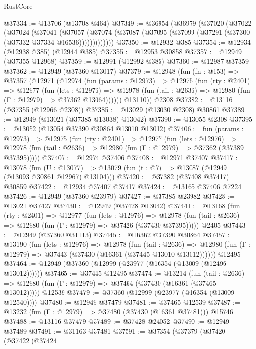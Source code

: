 \begin{lexlean}{RustCore}
\begin{coremodule}
@37334 := @13706 (@13708 @464)
@37349 := @36954
    (@36979
      (@37020
        (@37022
          (@37024
            (@37041
              (@37057
                (@37074 (@37087 (@37095 (@37099 (@37291 (@37300 (@37332 @37334 @16536)))))))))))))
@37350 := @12932 @385
@37354 := @12934 (@12938 @385) (@12944 @385)
@37355 := @12953 @30858
@37357 := @12949 (@37355 @12968)
@37359 := @12991 (@12992 @385)
@37360 := @12987 @37359
@37362 := @12949 (@37360 @13017)
@37379 := @12948
    (fun (fn : @153) =>
    @37357
      (@12971
        (@12974
          (fun (params : @12973) =>
          @12975
            (fun (rty : @2401) =>
            @12977
              (fun (lets : @12976) =>
              @12978 (fun (tail : @2636) => @12980 (fun (Γ : @12979) => @37362 @13064))))))
        @13110))
    @2308
@37382 := @13116 (@37355 (@12966 @2308))
@37385 := @13029 (@13030 @2308) @30861
@37389 := @12949 (@13021 (@37385 @13038) @13042)
@37390 := @13055 @2308
@37395 := @13052 (@13054 @37390 @30864 @13010 @13012)
@37406 := fun (params : @12973) =>
  @12975
    (fun (rty : @2401) =>
    @12977
      (fun (lets : @12976) =>
      @12978 (fun (tail : @2636) => @12980 (fun (Γ : @12979) => @37362 (@37389 @37395)))))
@37407 := @12974 @37406
@37408 := @12971 @37407
@37417 := @13078
    (fun (U : @13077) => @13079 (fun (t : @7) => @13087 (@12949 (@13093 @30861 @12967) @13104)))
@37420 := @37382 (@37408 @37417) @30859
@37422 := @12934 @37407 @37417
@37424 := @13165 @37406 @7224
@37426 := @12949 (@37360 @23979)
@37427 := @37385 @23982
@37428 := @13021 @37427
@37430 := @12949 (@37428 @13042)
@37441 := @13168
    (fun (rty : @2401) =>
    @12977
      (fun (lets : @12976) =>
      @12978 (fun (tail : @2636) => @12980 (fun (Γ : @12979) => @37426 (@37430 @37395)))))
    @2405
@37443 := @12949 (@37360 @31113)
@37445 := @16362 @37390 @30864
@37457 := @13190
    (fun (lets : @12976) =>
    @12978
      (fun (tail : @2636) =>
      @12980 (fun (Γ : @12979) => @37443 (@37430 (@16361 (@37445 @13010 @13012))))))
    @12495
@37464 := @12949 (@37360 (@12999 (@23977 (@16354 (@13009 (@12496 @13012))))))
@37465 := @37445 @12495
@37474 := @13214
    (fun (tail : @2636) => @12980 (fun (Γ : @12979) => @37464 (@37430 (@16361 (@37465 @13012)))))
    @12539
@37479 := @37360 (@12999 (@23977 (@16354 (@13009 @12540))))
@37480 := @12949 @37479
@37481 := @37465 @12539
@37487 := @13232 (fun (Γ : @12979) => @37480 (@37430 (@16361 @37481))) @15746
@37488 := @13116 @37479
@37489 := @37428 @24052
@37490 := @12949 @37489
@37491 := @31163 @37481
@37591 := @37354
    (@37379
      (@37420
        (@37422
          (@37424

\end{coremodule}
\end{lexlean}
